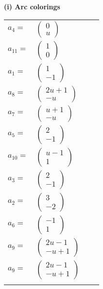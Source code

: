 \documentclass[1p]{elsarticle_modified}
\theoremstyle{definition}
\begin{document}
\flushleft \textbf{(i) Arc colorings}\\
\begin{tabular}{m{7pt} m{180pt} m{7pt} m{180pt} }
\flushright $a_{4}=$&$\begin{pmatrix}0\\u\end{pmatrix}$ \\
\flushright $a_{11}=$&$\begin{pmatrix}1\\0\end{pmatrix}$ \\
\flushright $a_{1}=$&$\begin{pmatrix}1\\-1\end{pmatrix}$ \\
\flushright $a_{8}=$&$\begin{pmatrix}2 u+1\\- u\end{pmatrix}$ \\
\flushright $a_{7}=$&$\begin{pmatrix}u+1\\- u\end{pmatrix}$ \\
\flushright $a_{5}=$&$\begin{pmatrix}2\\-1\end{pmatrix}$ \\
\flushright $a_{10}=$&$\begin{pmatrix}u-1\\1\end{pmatrix}$ \\
\flushright $a_{3}=$&$\begin{pmatrix}2\\-1\end{pmatrix}$ \\
\flushright $a_{2}=$&$\begin{pmatrix}3\\-2\end{pmatrix}$ \\
\flushright $a_{6}=$&$\begin{pmatrix}-1\\1\end{pmatrix}$ \\
\flushright $a_{9}=$&$\begin{pmatrix}2 u-1\\- u+1\end{pmatrix}$\\ \flushright $a_{9}=$&$\begin{pmatrix}2 u-1\\- u+1\end{pmatrix}$\\&\end{tabular}
\end{document}
